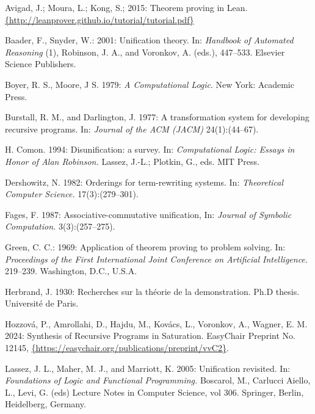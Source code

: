 \documentclass[runningheads]{llncs}
\begin{document}
\begin{thebibliography}{apalike}

\citep{lean} Avigad, J.;  Moura, L.; Kong,  S.; 2015: Theorem proving in Lean. 
\url{{http://leanprover.github.io/tutorial/tutorial.pdf}}


\citep{baa:sny}
Baader, F.,  Snyder, W.: 
2001: Unification theory. In: \emph {Handbook of Automated Reasoning} (1), Robinson, J. A., and Voronkov, A. (eds.), 447–533. Elsevier Science Publishers.

\citep{boy:moo}
Boyer, R. S., Moore, J S.
1979: \emph{A Computational Logic}.
New York: Academic Press.



\citep{bur:dar}
Burstall, R. M., and Darlington, J.
1977: A transformation system for developing recursive programs. In: \emph{Journal of the ACM (JACM)} 24(1):(44--67).

\citep{comon:disu}
H. Comon. 1994: Disunification: a survey. In: \emph{Computational Logic: Essays in Honor of Alan Robinson.} Lassez, J.-L.; Plotkin, G., eds. MIT Press.

\citep{dersh}
Dershowitz, N.
1982: Orderings for term-rewriting systems. In: \emph{Theoretical Computer Science.} 
 17(3):(279--301).

\citep{fag:acu}
Fages, F. 1987: Associative-commutative unification,
In: \emph{Journal of Symbolic Computation.}
3(3):(257--275).
 
\citep{ccg}
Green, C. C.: 1969: Application of theorem proving to problem solving.  In: \emph{Proceedings of the First International Joint Conference on Artificial Intelligence.} 219--239.
Washington, D.C., U.S.A.


\citep{her}
Herbrand, J. 1930:  Recherches sur la théorie de la demonstration. Ph.D thesis. Université de Paris.


\citep{hoz}
Hozzová, P., Amrollahi, D., Hajdu, M., Kovács, L., Voronkov, A., Wagner, E. M.  2024: Synthesis of Recursive Programs in Saturation. EasyChair Preprint
No. 12145,  \url{{https://easychair.org/publications/preprint/vvC2}}. 

\citep{las:mah:mar}
Lassez, J. L., Maher, M. J., and Marriott, K. 2005:
Unification revisited. In: \emph{Foundations of Logic and Functional Programming.}  Boscarol, M., Carlucci Aiello, L., Levi, G. (eds) Lecture Notes in Computer Science, vol 306. Springer, Berlin, Heidelberg, Germany. 


\end{thebibliography}
\end{document}
